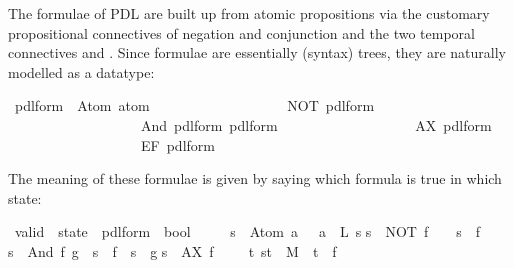 %
\begin{isabellebody}%
\def\isabellecontext{PDL}%
%
%
\begin{isamarkuptext}%
The formulae of PDL are built up from atomic propositions via the customary
propositional connectives of negation and conjunction and the two temporal
connectives  and . Since formulae are essentially
(syntax) trees, they are naturally modelled as a datatype:%
\end{isamarkuptext}%
\ pdl{\isacharunderscore}form\ {\isacharequal}\ Atom\ atom\isanewline
\ \ \ \ \ \ \ \ \ \ \ \ \ \ \ \ \ \ {\isacharbar}\ NOT\ pdl{\isacharunderscore}form\isanewline
\ \ \ \ \ \ \ \ \ \ \ \ \ \ \ \ \ \ {\isacharbar}\ And\ pdl{\isacharunderscore}form\ pdl{\isacharunderscore}form\isanewline
\ \ \ \ \ \ \ \ \ \ \ \ \ \ \ \ \ \ {\isacharbar}\ AX\ pdl{\isacharunderscore}form\isanewline
\ \ \ \ \ \ \ \ \ \ \ \ \ \ \ \ \ \ {\isacharbar}\ EF\ pdl{\isacharunderscore}form%
\begin{isamarkuptext}%
\noindent
The meaning of these formulae is given by saying which formula is true in
which state:%
\end{isamarkuptext}%
\ valid\ {\isacharcolon}{\isacharcolon}\ {\isachardoublequote}state\ {\isasymRightarrow}\ pdl{\isacharunderscore}form\ {\isasymRightarrow}\ bool{\isachardoublequote}\ {\isacharparenleft}{\isachardoublequote}{\isacharparenleft}{\isacharunderscore}\ {\isasymTurnstile}\ {\isacharunderscore}{\isacharparenright}{\isachardoublequote}\ {\isacharbrackleft}\ \isanewline
\isanewline
{}\isanewline
{\isachardoublequote}s\ {\isasymTurnstile}\ Atom\ a\ \ {\isacharequal}\ {\isacharparenleft}a\ {\isasymin}\ L\ s{\isacharparenright}{\isachardoublequote}\isanewline
{\isachardoublequote}s\ {\isasymTurnstile}\ NOT\ f\ \ \ {\isacharequal}\ {\isacharparenleft}{\isasymnot}{\isacharparenleft}s\ {\isasymTurnstile}\ f{\isacharparenright}{\isacharparenright}{\isachardoublequote}\isanewline
{\isachardoublequote}s\ {\isasymTurnstile}\ And\ f\ g\ {\isacharequal}\ {\isacharparenleft}s\ {\isasymTurnstile}\ f\ {\isasymand}\ s\ {\isasymTurnstile}\ g{\isacharparenright}{\isachardoublequote}\isanewline
{\isachardoublequote}s\ {\isasymTurnstile}\ AX\ f\ \ \ \ {\isacharequal}\ {\isacharparenleft}{\isasymforall}t{\isachardot}\ {\isacharparenleft}s{\isacharcomma}t{\isacharparenright}\ {\isasymin}\ M\ {\isasymlongrightarrow}\ t\ {\isasymTurnstile}\ f{\isacharparenright}{\isachardoublequote}\isanewline

\end{isabellebody}
